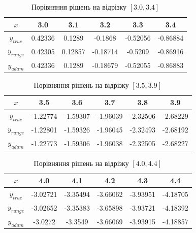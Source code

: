 \documentclass{article}
\begin{document}
        \begin{table}[h!]
            \centering
            \begin{tabular}{|c|c|c|c|c|c|}
                \hline
                $x$ & 3.0 & 3.1 & 3.2 & 3.3 & 3.4 \\
                \hline
                $y_{true}$ & 0.42336 & 0.1289 & -0.1868 & -0.52056 & -0.86884 \\
                \hline
                $y_{runge}$ & 0.42305 & 0.12857 & -0.18714 & -0.5209 & -0.86916 \\
                \hline
                $y_{adam}$ & 0.42336 & 0.1289 & -0.18679 & -0.52055 & -0.86883 \\
                \hline
            \end{tabular}
            \caption{Порівняння рішень на відрізку $[3.0, 3.4]$}
        \end{table}

        \begin{table}[h!]
            \centering
            \begin{tabular}{|c|c|c|c|c|c|}
                \hline
                $x$ & 3.5 & 3.6 & 3.7 & 3.8 & 3.9 \\
                \hline
                $y_{true}$ & -1.22774 & -1.59307 & -1.96039 & -2.32506 & -2.68229 \\
                \hline
                $y_{runge}$ & -1.22801 & -1.59326 & -1.96045 & -2.32493 & -2.68192 \\
                \hline
                $y_{adam}$ & -1.22773 & -1.59306 & -1.96038 & -2.32505 & -2.68227 \\
                \hline
            \end{tabular}
            \caption{Порівняння рішень на відрізку $[3.5, 3.9]$}
        \end{table}

        \begin{table}[h!]
            \centering
            \begin{tabular}{|c|c|c|c|c|c|}
                \hline
                $x$ & 4.0 & 4.1 & 4.2 & 4.3 & 4.4 \\
                \hline
                $y_{true}$ & -3.02721 & -3.35494 & -3.66062 & -3.93951 & -4.18705 \\
                \hline
                $y_{runge}$ & -3.02652 & -3.35383 & -3.65898 & -3.93721 & -4.18392 \\
                \hline
                $y_{adam}$ & -3.0272 & -3.3549 & -3.66069 & -3.93915 & -4.18857 \\
                \hline
            \end{tabular}
            \caption{Порівняння рішень на відрізку $[4.0, 4.4]$}
        \end{table}
\end{document}

